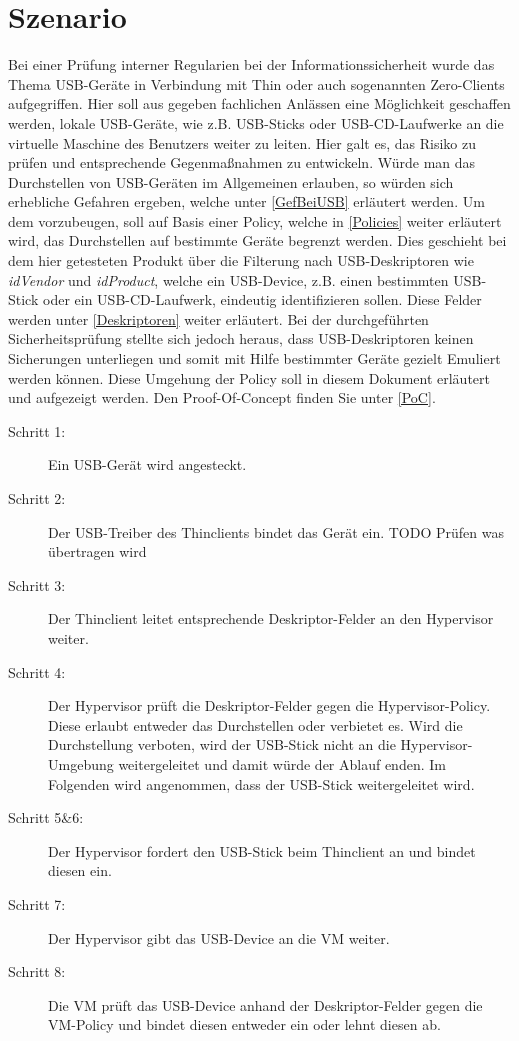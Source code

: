 \chapter{Szenario}
Bei einer Prüfung interner Regularien bei der Informationssicherheit wurde das Thema USB-Geräte in Verbindung mit Thin oder auch sogenannten Zero-Clients aufgegriffen. Hier soll aus gegeben fachlichen Anlässen eine Möglichkeit geschaffen werden, lokale USB-Geräte, wie z.B. USB-Sticks oder USB-CD-Laufwerke an die virtuelle Maschine des Benutzers weiter zu leiten. Hier galt es, das Risiko zu prüfen und entsprechende Gegenmaßnahmen zu entwickeln. 
Würde man das Durchstellen von USB-Geräten im Allgemeinen erlauben, so würden sich erhebliche Gefahren ergeben, welche unter \ref{GefBeiUSB} erläutert werden. Um dem vorzubeugen, soll auf Basis einer Policy, welche in \ref{Policies} weiter erläutert wird, das Durchstellen auf bestimmte Geräte begrenzt werden. Dies geschieht bei dem hier getesteten Produkt über die Filterung nach USB-Deskriptoren wie \textit{idVendor} und \textit{idProduct}, welche ein USB-Device, z.B. einen bestimmten USB-Stick oder ein USB-CD-Laufwerk, eindeutig identifizieren sollen. Diese Felder werden unter \ref{Deskriptoren} weiter erläutert.
Bei der durchgeführten Sicherheitsprüfung stellte sich jedoch heraus, dass USB-Deskriptoren keinen Sicherungen unterliegen und somit mit Hilfe bestimmter Geräte gezielt Emuliert werden können. Diese Umgehung der Policy soll in diesem Dokument erläutert und aufgezeigt werden. Den Proof-Of-Concept finden Sie unter \ref{PoC}.



\begin{description}
	\item[Schritt 1: ] Ein USB-Gerät wird angesteckt.
	\item[Schritt 2: ] Der USB-Treiber des Thinclients bindet das Gerät ein. TODO Prüfen was übertragen wird
	\item[Schritt 3: ] Der Thinclient leitet entsprechende Deskriptor-Felder an den Hypervisor weiter.
	\item[Schritt 4: ] Der Hypervisor prüft die Deskriptor-Felder gegen die Hypervisor-Policy. Diese erlaubt entweder das Durchstellen oder verbietet es. Wird die Durchstellung verboten, wird der USB-Stick nicht an die Hypervisor-Umgebung weitergeleitet und damit würde der Ablauf enden. Im Folgenden wird angenommen, dass der USB-Stick weitergeleitet wird.
	\item[Schritt 5\&6: ] Der Hypervisor fordert den USB-Stick beim Thinclient an und bindet diesen ein.
	\item[Schritt 7: ] Der Hypervisor gibt das USB-Device an die VM weiter.
	\item[Schritt 8: ] Die VM prüft das USB-Device anhand der Deskriptor-Felder gegen die VM-Policy und bindet diesen entweder ein oder lehnt diesen ab.
\end{description}